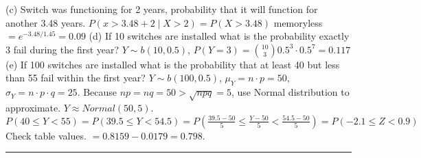 \documentclass[9pt]{article}
\begin{document}
\begin{multicols*}{2}
    (c) Switch was functioning for 2 years, probability that it will function for another 3.48 years.
    $P(x > 3.48 + 2 \mid X>2) = P(X > 3.48) $ memoryless $ = e^{-3.48/1.45}=0.09$\newline
    (d) If 10 switches are installed what is the probability exactly 3 fail during the first year?
    $Y \sim b(10, 0.5 )$, $P(Y=3) = \binom{10}{3}0.5^3\cdot 0.5^7 = 0.117$\newline
    (e) If 100 switches are installed what is the probability that at least 40 but less than 55 fail within the first year?
    $Y\sim b(100, 0.5)$, $\mu_Y = n\cdot p = 50$, $\sigma_Y = n\cdot p\cdot q = 25$. Because $np=nq = 50 >\sqrt{npq} = 5 $, use Normal distribution to approximate. 
    $Y\approx Normal(50,5)$. $P(40 \leq Y < 55) = P(39.5 \leq Y < 54.5) = P(\frac{39.5-50}{5} \leq \frac{Y-50}{5} < \frac{54.5-50}{5})
    = P(-2.1 \leq Z < 0.9) $ Check table values. $= 0.8159 - 0.0179 = 0.798$.
    \rule{0.5\textwidth}{0.4pt}
\end{multicols*}
\end{document}

